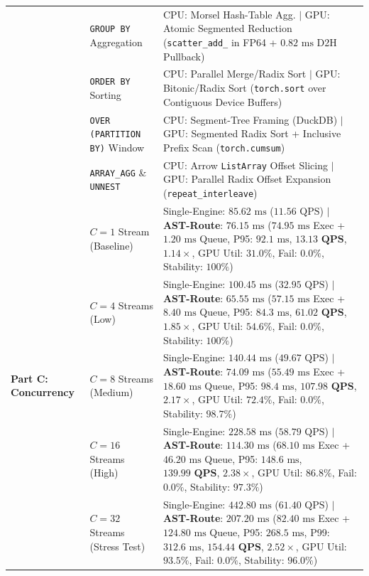 \documentclass[10pt,a4paper]{article}
\begin{document}
\begin{table}[!t]
\begin{tabular}{@{}p{}p{}p{}@{}}
 & \texttt{GROUP BY} Aggregation & CPU: Morsel Hash-Table Agg. $|$ GPU: Atomic Segmented Reduction (\texttt{scatter\_add\_} in FP64 + $0.82\text{ ms}$ D2H Pullback) \\
 & \texttt{ORDER BY} Sorting & CPU: Parallel Merge/Radix Sort $|$ GPU: Bitonic/Radix Sort (\texttt{torch.sort} over Contiguous Device Buffers) \\
 & \texttt{OVER (PARTITION BY)} Window & CPU: Segment-Tree Framing (DuckDB) $|$ GPU: Segmented Radix Sort + Inclusive Prefix Scan (\texttt{torch.cumsum}) \\
 & \texttt{ARRAY\_AGG} \& \texttt{UNNEST} & CPU: Arrow \texttt{ListArray} Offset Slicing $|$ GPU: Parallel Radix Offset Expansion (\texttt{repeat\_interleave}) \\
\midrule
\multirow{5}{=}{\textbf{Part C: Concurrency}}
 & $C=1$ Stream (Baseline) & Single-Engine: $85.62\text{ ms}$ ($11.56\text{ QPS}$) $|$ \textbf{AST-Route}: $76.15\text{ ms}$ ($74.95\text{ ms}$ Exec + $1.20\text{ ms}$ Queue, P95: $92.1\text{ ms}$, $\mathbf{13.13\text{ QPS}}$, $1.14\times$, GPU Util: $31.0\%$, Fail: $0.0\%$, Stability: $100\%$) \\
 & $C=4$ Streams (Low) & Single-Engine: $100.45\text{ ms}$ ($32.95\text{ QPS}$) $|$ \textbf{AST-Route}: $65.55\text{ ms}$ ($57.15\text{ ms}$ Exec + $8.40\text{ ms}$ Queue, P95: $84.3\text{ ms}$, $\mathbf{61.02\text{ QPS}}$, $1.85\times$, GPU Util: $54.6\%$, Fail: $0.0\%$, Stability: $100\%$) \\
 & $C=8$ Streams (Medium) & Single-Engine: $140.44\text{ ms}$ ($49.67\text{ QPS}$) $|$ \textbf{AST-Route}: $74.09\text{ ms}$ ($55.49\text{ ms}$ Exec + $18.60\text{ ms}$ Queue, P95: $98.4\text{ ms}$, $\mathbf{107.98\text{ QPS}}$, $2.17\times$, GPU Util: $72.4\%$, Fail: $0.0\%$, Stability: $98.7\%$) \\
 & $C=16$ Streams (High) & Single-Engine: $228.58\text{ ms}$ ($58.79\text{ QPS}$) $|$ \textbf{AST-Route}: $114.30\text{ ms}$ ($68.10\text{ ms}$ Exec + $46.20\text{ ms}$ Queue, P95: $148.6\text{ ms}$, $\mathbf{139.99\text{ QPS}}$, $2.38\times$, GPU Util: $86.8\%$, Fail: $0.0\%$, Stability: $97.3\%$) \\
 & $C=32$ Streams (Stress Test) & Single-Engine: $442.80\text{ ms}$ ($61.40\text{ QPS}$) $|$ \textbf{AST-Route}: $207.20\text{ ms}$ ($82.40\text{ ms}$ Exec + $124.80\text{ ms}$ Queue, P95: $268.5\text{ ms}$, P99: $312.6\text{ ms}$, $\mathbf{154.44\text{ QPS}}$, $\mathbf{2.52\times}$, GPU Util: $93.5\%$, Fail: $0.0\%$, Stability: $96.0\%$) \\
\bottomrule
\end{tabular}
\end{table}
\end{document}
